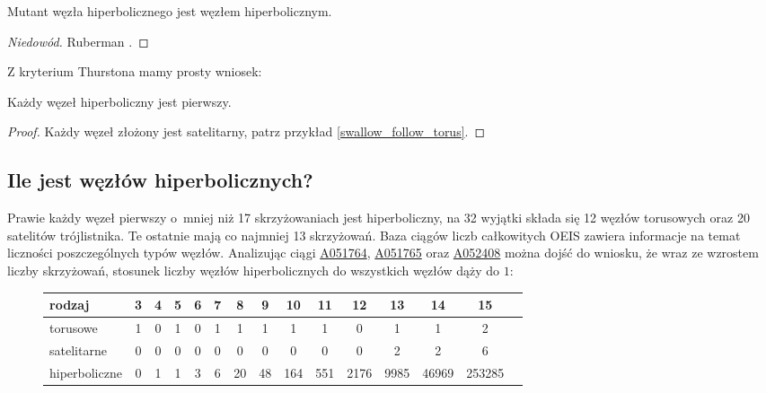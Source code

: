 \begin{proposition}
    Mutant węzła hiperbolicznego jest węzłem hiperbolicznym.
\end{proposition}

\begin{proof}[Niedowód]
%
    Ruberman \cite[wniosek 1.4]{ruberman1987}.
\end{proof}

Z kryterium Thurstona mamy prosty wniosek:

\begin{corollary}
    Każdy węzeł hiperboliczny jest pierwszy.
\end{corollary}

\begin{proof}
    Każdy węzeł złożony jest satelitarny, patrz przykład \ref{swallow_follow_torus}.
\end{proof}

\subsection{Ile jest węzłów hiperbolicznych?}
Prawie każdy węzeł pierwszy o~mniej niż 17 skrzyżowaniach jest hiperboliczny, na 32 wyjątki składa się 12 węzłów torusowych oraz 20 satelitów trójlistnika.
\label{page:nonhyperbolic_below_16}%
Te ostatnie mają co najmniej 13 skrzyżowań.
Baza ciągów liczb całkowitych OEIS zawiera informacje na temat liczności poszczególnych typów węzłów.
Analizując ciągi \href{https://oeis.org/A051764}{A051764}, \href{https://oeis.org/A051765}{A051765} oraz \href{https://oeis.org/A052408}{A052408} można dojść do wniosku, że wraz ze wzrostem liczby skrzyżowań, stosunek liczby węzłów hiperbolicznych do wszystkich węzłów dąży do $1$:

\begin{figure}[H]
\renewcommand*{\arraystretch}{1.4}
\footnotesize
\begin{longtable}{lcccccccccccccc}
\hline
    \textbf{rodzaj} & 3 & 4 & 5 & 6 & 7 & 8  & 9  & 10  & 11  & 12   & 13   & 14    & 15     \\ \hline \endhead
    torusowe        & 1 & 0 & 1 & 0 & 1 & 1  & 1  & 1   & 1   & 0    & 1    & 1     & 2      \\
    satelitarne     & 0 & 0 & 0 & 0 & 0 & 0  & 0  & 0   & 0   & 0    & 2    & 2     & 6      \\
    hiperboliczne   & 0 & 1 & 1 & 3 & 6 & 20 & 48 & 164 & 551 & 2176 & 9985 & 46969 & 253285 \\
    \hline
\end{longtable}
\normalsize
\end{figure}

